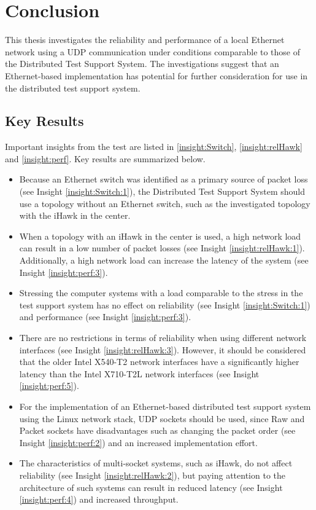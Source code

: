 \chapter{Conclusion} \label{chap:Conclusion}
This thesis investigates the reliability and performance of a local Ethernet network using a UDP communication under conditions comparable to those of the Distributed Test Support System. The investigations suggest that an Ethernet-based implementation has potential for further consideration for use in the distributed test support system.

\section{Key Results}
Important insights from the test are listed in \ref{insight:Switch}, \ref{insight:relHawk} and \ref{insight:perf}. Key results are summarized below.

\begin{itemize}
	\item Because an Ethernet switch was identified as a primary source of packet loss (see Insight \ref{insight:Switch:1}), the Distributed Test Support System should use a topology without an Ethernet switch, such as the investigated topology with the iHawk in the center.
	\item When a topology with an iHawk in the center is used, a high network load can result in a low number of packet losses (see Insight \ref{insight:relHawk:1}). Additionally, a high network load can increase the latency of the system (see Insight \ref{insight:perf:3}).
	\item Stressing the computer systems with a load comparable to the stress in the test support system has no effect on reliability (see Insight \ref{insight:Switch:1}) and performance (see Insight \ref{insight:perf:3}).
	\item There are no restrictions in terms of reliability when using different network interfaces (see Insight \ref{insight:relHawk:3}). However, it should be considered that the older Intel X540-T2 network interfaces have a significantly higher latency than the Intel X710-T2L network interfaces (see Insight \ref{insight:perf:5}).
	\item For the implementation of an Ethernet-based distributed test support system using the Linux network stack, UDP sockets should be used, since Raw and Packet sockets have disadvantages such as changing the packet order (see Insight \ref{insight:perf:2}) and an increased implementation effort.
	\item The characteristics of multi-socket systems, such as iHawk, do not affect reliability (see Insight \ref{insight:relHawk:2}), but paying attention to the architecture of such systems can result in reduced latency (see Insight \ref{insight:perf:4}) and increased throughput.
\end{itemize}


